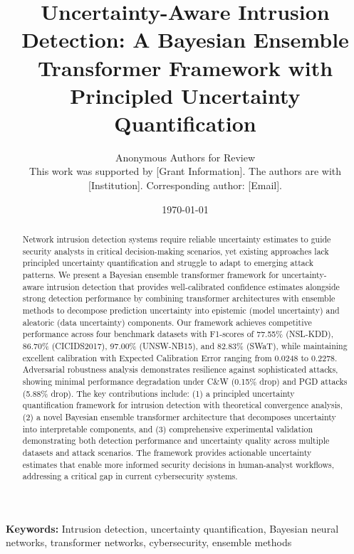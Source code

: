 \documentclass[journal]{IEEEtran}
\begin{document}
\title{Uncertainty-Aware Intrusion Detection: A Bayesian Ensemble Transformer Framework with Principled Uncertainty Quantification}

\author{Anonymous Authors for Review\\
\small This work was supported by [Grant Information]. The authors are with [Institution]. Corresponding author: [Email].
}

\date{\today}

\maketitle

\begin{abstract}
Network intrusion detection systems require reliable uncertainty estimates to guide security analysts in critical decision-making scenarios, yet existing approaches lack principled uncertainty quantification and struggle to adapt to emerging attack patterns. We present a Bayesian ensemble transformer framework for uncertainty-aware intrusion detection that provides well-calibrated confidence estimates alongside strong detection performance by combining transformer architectures with ensemble methods to decompose prediction uncertainty into epistemic (model uncertainty) and aleatoric (data uncertainty) components. Our framework achieves competitive performance across four benchmark datasets with F1-scores of 77.55\% (NSL-KDD), 86.70\% (CICIDS2017), 97.00\% (UNSW-NB15), and 82.83\% (SWaT), while maintaining excellent calibration with Expected Calibration Error ranging from 0.0248 to 0.2278. Adversarial robustness analysis demonstrates resilience against sophisticated attacks, showing minimal performance degradation under C\&W (0.15\% drop) and PGD attacks (5.88\% drop). The key contributions include: (1) a principled uncertainty quantification framework for intrusion detection with theoretical convergence analysis, (2) a novel Bayesian ensemble transformer architecture that decomposes uncertainty into interpretable components, and (3) comprehensive experimental validation demonstrating both detection performance and uncertainty quality across multiple datasets and attack scenarios. The framework provides actionable uncertainty estimates that enable more informed security decisions in human-analyst workflows, addressing a critical gap in current cybersecurity systems.
\end{abstract}

\textbf{Keywords:} Intrusion detection, uncertainty quantification, Bayesian neural networks, transformer networks, cybersecurity, ensemble methods
\end{document}
